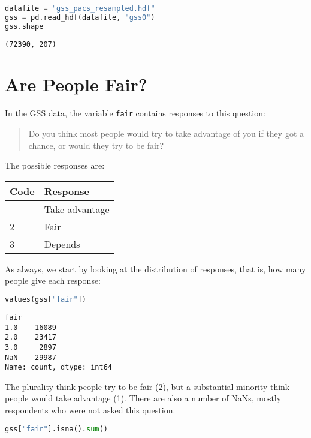 \begin{lstlisting}[language=Python,style=source]
datafile = "gss_pacs_resampled.hdf"
gss = pd.read_hdf(datafile, "gss0")
gss.shape
\end{lstlisting}

\begin{lstlisting}[style=output]
(72390, 207)
\end{lstlisting}

\section{Are People Fair?}\label{are-people-fair}

In the GSS data, the variable \passthrough{\lstinline!fair!} contains
responses to this question:

\begin{quote}
Do you think most people would try to take advantage of you if they got
a chance, or would they try to be fair?
\end{quote}

The possible responses are:

\begin{longtable}[]{@{}ll@{}}
\midrule\noalign{}
Code & Response \\
\midrule\noalign{}
\endhead
\midrule\noalign{}
\endlastfoot
1 & Take advantage \\
2 & Fair \\
3 & Depends \\
\end{longtable}

As always, we start by looking at the distribution of responses, that
is, how many people give each response:

\begin{lstlisting}[language=Python,style=source]
values(gss["fair"])
\end{lstlisting}

\begin{lstlisting}[style=output]
fair
1.0    16089
2.0    23417
3.0     2897
NaN    29987
Name: count, dtype: int64
\end{lstlisting}

The plurality think people try to be fair (2), but a substantial
minority think people would take advantage (1). There are also a number
of NaNs, mostly respondents who were not asked this question.

\begin{lstlisting}[language=Python,style=source]
gss["fair"].isna().sum()
\end{lstlisting}

